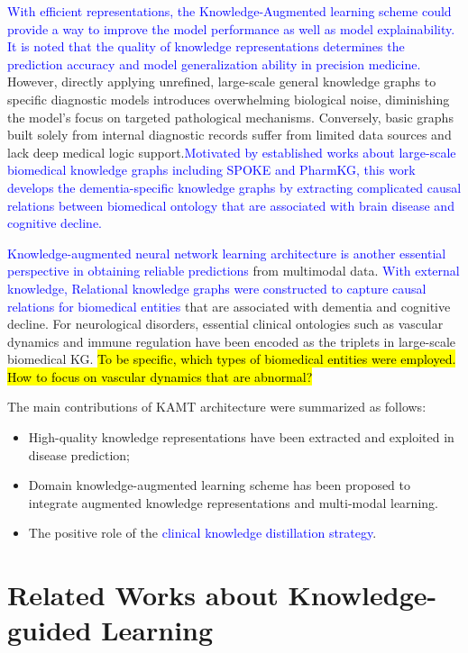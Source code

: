 \documentclass[lettersize,journal]{IEEEtran}
\begin{document}
    \textcolor{blue}{With efficient representations, the Knowledge-Augmented learning scheme could provide a way to improve the model performance as well as model explainability. It is noted that the quality of knowledge representations determines the prediction accuracy and model generalization ability in precision medicine.} However, directly applying unrefined, large-scale general knowledge graphs to specific diagnostic models introduces overwhelming biological noise, diminishing the model's focus on targeted pathological mechanisms. Conversely, basic graphs built solely from internal diagnostic records suffer from limited data sources and lack deep medical logic support.\textcolor{blue}{Motivated by established works about large-scale biomedical knowledge graphs including SPOKE and PharmKG, this work develops the dementia-specific knowledge graphs by extracting complicated causal relations between biomedical ontology that are associated with brain disease and cognitive decline.}

    \textcolor{blue}{Knowledge-augmented neural network learning architecture is another essential perspective in obtaining reliable predictions} from multimodal data. \textcolor{blue}{With external knowledge, Relational knowledge graphs were constructed to capture causal relations for biomedical entities} that are associated with dementia and cognitive decline. For neurological disorders, essential clinical ontologies such as vascular dynamics and immune regulation have been encoded as the triplets in large-scale biomedical KG.
    \hl{To be specific, which types of biomedical entities were employed. How to focus on vascular dynamics that are abnormal?}

    The main contributions of KAMT architecture were summarized as follows:
	
    \begin{itemize}
        \item High-quality knowledge representations have been extracted and exploited in disease prediction;
        \item Domain knowledge-augmented learning scheme has been proposed to integrate augmented knowledge representations and multi-modal learning.
        \item The positive role of the \textcolor{blue}{clinical knowledge distillation strategy}.
    \end{itemize}


\section{Related Works about Knowledge-guided Learning}
\end{document}
